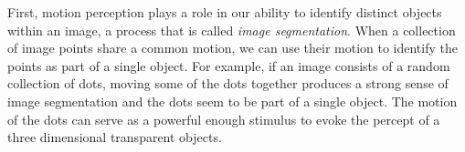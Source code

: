   First, motion perception plays a role in our
ability to identify distinct objects within an image, a process that
is called {\em image segmentation}.  When a collection of image points
share a common motion, we can use their motion to identify the points
as part of a single object.  For example, if an image consists of a
random collection of dots, moving some of the dots together produces a
strong sense of image segmentation and the dots seem to be part of a
single object.  The motion of the dots can serve as a powerful enough
stimulus to evoke the percept of a three dimensional transparent
objects.
